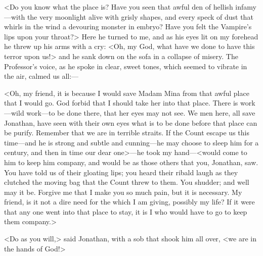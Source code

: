 <Do you know what the place is? Have you seen that awful den of hellish infamy—with the very moonlight alive with grisly shapes, and every speck of dust that whirls in the wind a devouring monster in embryo? Have you felt the Vampire's lips upon your throat?> Here he turned to me, and as his eyes lit on my forehead he threw up his arms with a cry: <Oh, my God, what have we done to have this terror upon us!> and he sank down on the sofa in a collapse of misery. The Professor's voice, as he spoke in clear, sweet tones, which seemed to vibrate in the air, calmed us all:—

<Oh, my friend, it is because I would save Madam Mina from that awful place that I would go. God forbid that I should take her into that place. There is work—wild work—to be done there, that her eyes may not see. We men here, all save Jonathan, have seen with their own eyes what is to be done before that place can be purify. Remember that we are in terrible straits. If the Count escape us this time—and he is strong and subtle and cunning—he may choose to sleep him for a century, and then in time our dear one>—he took my hand—<would come to him to keep him company, and would be as those others that you, Jonathan, saw. You have told us of their gloating lips; you heard their ribald laugh as they clutched the moving bag that the Count threw to them. You shudder; and well may it be. Forgive me that I make you so much pain, but it is necessary. My friend, is it not a dire need for the which I am giving, possibly my life? If it were that any one went into that place to stay, it is I who would have to go to keep them company.>

<Do as you will,> said Jonathan, with a sob that shook him all over, <we are in the hands of God!>

 

